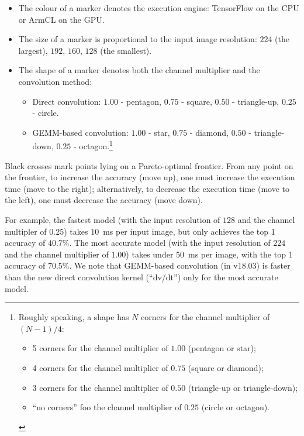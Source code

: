 \documentclass[sigplan]{acmart}
\begin{document}
\begin{itemize}

  \item The colour of a marker denotes the execution engine: TensorFlow on the CPU or ArmCL on the GPU.

  \item The size of a marker is proportional to the input image resolution: $224$ (the largest), $192$, $160$, $128$ (the smallest).

  \item The shape of a marker denotes both the channel multiplier and the convolution method:
  \begin{itemize}
    \item Direct convolution: $1.00$ - pentagon, $0.75$ - square, $0.50$ - triangle-up, $0.25$ - circle.
    \item GEMM-based convolution: $1.00$ - star, $0.75$ - diamond, $0.50$ - triangle-down, $0.25$ - octagon.\footnote{%
      Roughly speaking, a shape has $N$ corners for the channel multiplier of $(N-1)/4$:
      \begin{itemize}
        \item 5 corners for the channel multiplier of $1.00$ (pentagon or star);
        \item 4 corners for the channel multiplier of $0.75$ (square or diamond);
        \item 3 corners for the channel multiplier of $0.50$ (triangle-up or triangle-down);
        \item ``no corners'' foo the channel multiplier of $0.25$ (circle or octagon).
      \end{itemize}
      }
  \end{itemize}
\end{itemize}

Black crosses mark points lying on a Pareto-optimal frontier. 
%
From any point on the frontier, to increase the accuracy (move up), one must
increase the execution time (move to the right); alternatively, to decrease the
execution time (move to the left), one must decrease the accuracy (move down).

For example, the fastest model (with the input resolution of $128$ and the
channel multipler of $0.25$) takes $10$~ms per input image, but only achieves
the top 1 accuracy of $40.7\%$. 
%
The most accurate model (with the input resolution of $224$ and the channel
multiplier of $1.00$) takes under $50$~ms per image, with the top 1 accuracy of
$70.5\%$.
%
We note that GEMM-based convolution (in v18.03) is faster than the new direct
convolution kernel (``dv/dt'') only for the most accurate model.
\end{document}
